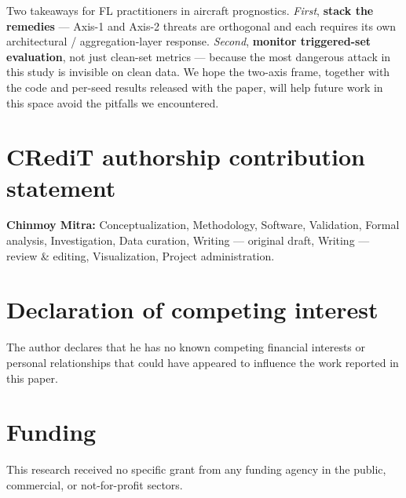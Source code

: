 \documentclass[preprint,12pt,authoryear]{elsarticle}
\begin{document}
Two takeaways for FL practitioners in aircraft prognostics.
\emph{First}, \textbf{stack the remedies} --- Axis-1 and Axis-2
threats are orthogonal and each requires its own
architectural / aggregation-layer response. \emph{Second},
\textbf{monitor triggered-set evaluation}, not just clean-set
metrics --- because the most dangerous attack in this study is
invisible on clean data. We hope the two-axis frame, together with
the code and per-seed results released with the paper, will help
future work in this space avoid the pitfalls we encountered.




\section*{CRediT authorship contribution statement}
\textbf{Chinmoy Mitra:} Conceptualization, Methodology, Software,
Validation, Formal analysis, Investigation, Data curation,
Writing --- original draft, Writing --- review \& editing,
Visualization, Project administration.

\section*{Declaration of competing interest}
The author declares that he has no known competing financial
interests or personal relationships that could have appeared to
influence the work reported in this paper.

\section*{Funding}
This research received no specific grant from any funding agency in
the public, commercial, or not-for-profit sectors.
\end{document}
